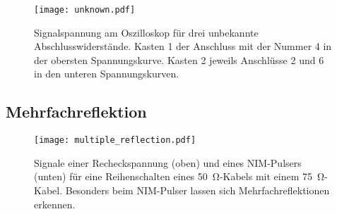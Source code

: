 \begin{figure}
  \centering
  \texttt{[image: unknown.pdf]}
  \caption{%
    Signalspannung am Oszilloskop für drei unbekannte Abschlusswiderstände.
    Kasten 1 der Anschluss mit der Nummer 4 in der obersten Spannungskurve. Kasten 2 jeweils Anschlüsse 2 und 6 in den
    unteren Spannungskurven.
  }\label{fig:unknown}
\end{figure}

\subsection{Mehrfachreflektion}

\begin{figure}
  \centering
  \texttt{[image: multiple\_reflection.pdf]}
  \caption{%
    Signale einer Recheckspannung (oben) und eines NIM-Pulsers (unten) für eine Reihenschalten eines \SI{50}{\ohm}-Kabels mit einem \SI{75}{\ohm}-Kabel.
    Besonders beim NIM-Pulser lassen sich Mehrfachreflektionen erkennen.
  }\label{fig:multiple_reflection}
\end{figure}
